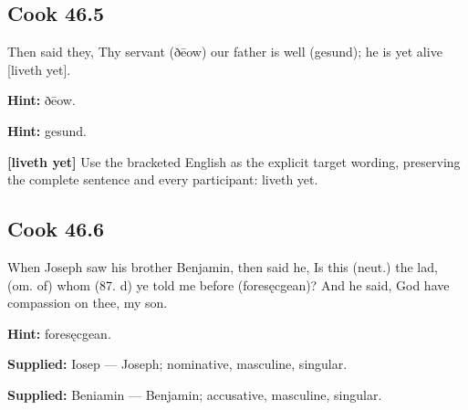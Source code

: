 \par\begin{minipage}{\linewidth}\raggedright
\subsection*{Cook 46.5}

Then said they, Thy servant (ðēow) our father is well (gesund); he is yet alive [liveth yet].

\textbf{Hint:} ðēow.

\textbf{Hint:} gesund.

\textbf{[liveth yet]} Use the bracketed English as the explicit target wording, preserving the complete sentence and every participant: liveth yet.

\end{minipage}\par\addvspace{4pt}

\par\begin{minipage}{\linewidth}\raggedright
\subsection*{Cook 46.6}

When Joseph saw his brother Benjamin, then said he, Is this (neut.) the lad, (om. of) whom (87. d) ye told me before (foresęcgean)? And he said, God have compassion on thee, my son.

\textbf{Hint:} foresęcgean.

\textbf{Supplied:} Iosep — Joseph; nominative, masculine, singular.

\end{minipage}\par\addvspace{4pt}

\textbf{Supplied:} Beniamin — Benjamin; accusative, masculine, singular.

